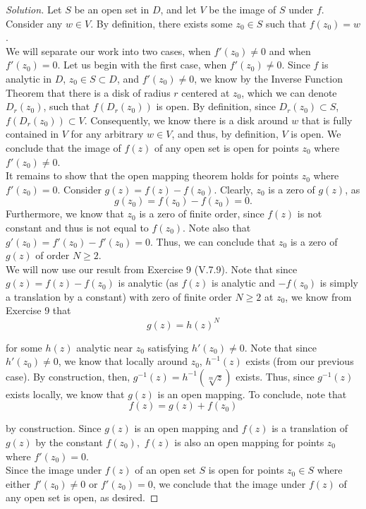 \documentclass[11pt]{article}
\newenvironment{solution}
  {\renewcommand\qedsymbol{$\blacksquare$}\begin{proof}[Solution]}
  {\end{proof}}
\theoremstyle{definition}
\begin{document}
\begin{solution}
Let $S$ be an open set in $D$, and let $V$ be the image of $S$ under $f$. Consider any $w \in V$. By definition, there exists some $z_0 \in S$ such that $f(z_0) = w$. \\

We will separate our work into two cases, when $f'(z_0) \neq 0$ and when $f'(z_0) = 0$. Let us begin with the first case, when $f'(z_0) \neq 0$. Since $f$ is analytic in $D$, $z_0 \in S \subset D$, and $f'(z_0) \neq 0$, we know by the Inverse Function Theorem that there is a 
disk of radius $r$ centered at $z_0$, which we can denote $D_r(z_0)$, such that $f(D_r(z_0))$ is open. By definition, since $D_r(z_0) \subset S$, $f(D_r(z_0)) \subset V$. Consequently, we know there is a disk around $w$ that is fully contained in $V$ for any arbitrary $w \in V$, and thus, by definition, $V$ is open. We conclude that 
the image of $f(z)$ of any open set is open for points $z_0$ where $f'(z_0) \neq 0$. \\

It remains to show that the open mapping theorem holds for points $z_0$ where $f'(z_0) = 0$. Consider $g(z) = f(z) - f(z_0)$. Clearly, $z_0$ is a zero of $g(z)$, as \[g(z_0) = f(z_0) - f(z_0) = 0.\] Furthermore, we know that $z_0$ is a zero of finite order, since $f(z)$ is not constant and thus is not equal to $f(z_0)$. Note also that $g'(z_0) = f'(z_0) - f'(z_0) = 0.$ Thus, we can conclude that $z_0$ is a zero of $g(z)$ of order $N \geq 2$.\\

We will now use our result from Exercise 9 (V.7.9). Note that since $g(z) = f(z) - f(z_0)$ is analytic (as $f(z)$ is analytic and $-f(z_0)$ is simply a translation by a constant) with zero of finite order $N \geq 2$ at $z_0$, we know from Exercise 9 that 
\[ g(z) = h(z)^N \]

for some $h(z)$ analytic near $z_0$ satisfying $h'(z_0) \neq 0$. Note that since $h'(z_0) \neq 0$, we know that locally around $z_0$, $h^{-1}(z)$ exists (from our previous case). By construction, then, $g^{-1}(z) = h^{-1}(\sqrt[m]{z})$ exists. Thus, since $g^{-1}(z)$ exists locally, we know that $g(z)$ is an open mapping. To conclude, note that
\[ f(z) = g(z) + f(z_0)\]

by construction. Since $g(z)$ is an open mapping and $f(z)$ is a translation of $g(z)$ by the constant $f(z_0),$ $f(z)$ is also an open mapping for points $z_0$ where $f'(z_0) = 0$. \\

Since the image under $f(z)$ of an open set $S$ is open for points $z_0 \in S$ where either $f'(z_0) \neq 0$ or $f'(z_0) = 0$, we conclude that the image under $f(z)$ of any open set is open, as desired.\end{solution}
\end{document}
